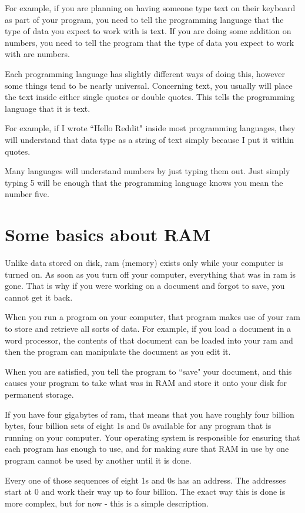 \documentclass[a4paper,12pt]{article}
\let\stdsection\section
\renewcommand\section{\newpage\stdsection}
\begin{document}
For example, if you are planning on having someone type text on their keyboard as part of your program, you need to tell the programming language that the type of data you expect to work with is text. If you are doing some addition on numbers, you need to tell the program that the type of data you expect to work with are numbers.

Each programming language has slightly different ways of doing this, however some things tend to be nearly universal. Concerning text, you usually will place the text inside either single quotes or double quotes. This tells the programming language that it is text.

For example, if I wrote ``Hello Reddit" inside most programming languages, they will understand that data type as a string of text simply because I put it within quotes.

Many languages will understand numbers by just typing them out. Just simply typing 5 will be enough that the programming language knows you mean the number five.
\section{Some basics about RAM}
Unlike data stored on disk, ram (memory) exists only while your computer is turned on. As soon as you turn off your computer, everything that was in ram is gone. That is why if you were working on a document and forgot to save, you cannot get it back.

When you run a program on your computer, that program makes use of your ram to store and retrieve all sorts of data. For example, if you load a document in a word processor, the contents of that document can be loaded into your ram and then the program can manipulate the document as you edit it.

When you are satisfied, you tell the program to ``save" your document, and this causes your program to take what was in RAM and store it onto your disk for permanent storage.

If you have four gigabytes of ram, that means that you have roughly four billion bytes, four billion sets of eight 1s and 0s available for any program that is running on your computer. Your operating system is responsible for ensuring that each program has enough to use, and for making sure that RAM in use by one program cannot be used by another until it is done.

Every one of those sequences of eight 1s and 0s has an address. The addresses start at 0 and work their way up to four billion. The exact way this is done is more complex, but for now - this is a simple description.
\end{document}
